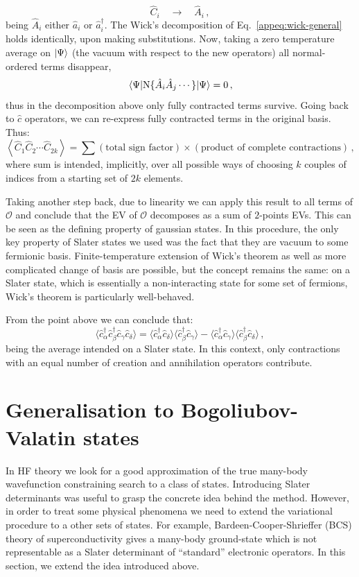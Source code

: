 \[
	\hat C_i \quad\to\quad \hat A_i \, ,
\]
being $\hat A_i$ either $\hat a_i$ or $\hat a_i^\dagger$. The Wick's decomposition of Eq.~\eqref{appeq:wick-general} holds identically, upon making substitutions. Now, taking a zero temperature average on $\ket{\Psi}$ (the vacuum with respect to the new operators) all normal-ordered terms disappear,
\[
	\mel{\Psi}{\mathrm{N}\lbrace \hat A_i \hat A_j \cdots \rbrace}{\Psi} = 0 \, ,
\]
thus in the decomposition above only fully contracted terms survive. Going back to $\hat c$ operators, we can re-express fully contracted terms in the original basis. Thus:
\[
	\left\langle \hat C_1 \hat C_2 \cdots \hat C_{2k} \right\rangle = \sum (\text{total sign factor}) \times (\text{product of complete contractions}) \, ,
\]
where sum is intended, implicitly, over all possible ways of choosing $k$ couples of indices from a starting set of $2k$ elements.

Taking another step back, due to linearity we can apply this result to all terms of $\mathcal{O}$ and conclude that the EV of $\mathcal{O}$ decomposes as a sum of $2$-points EVs. This can be seen as the defining property of gaussian states. In this procedure, the only key property of Slater states we used was the fact that they are vacuum to some fermionic basis. Finite-temperature extension of Wick's theorem as well as more complicated change of basis are possible, but the concept remains the same: on a Slater state, which is essentially a non-interacting state for some set of fermions, Wick's theorem is particularly well-behaved.

From the point above we can conclude that:
\[
	\langle
	\hat c_\alpha^\dagger \hat c_\beta^\dagger \hat c_\gamma \hat c_\delta
	\rangle =
	\langle 
	\hat c_\alpha^\dagger \hat c_\delta
	\rangle \langle	
	\hat c_\beta^\dagger \hat c_\gamma 
	\rangle
	- 
	\langle 
	\hat c_\alpha^\dagger \hat c_\gamma
	\rangle \langle	
	\hat c_\beta^\dagger \hat c_\delta 
	\rangle \, ,
\]
being the average intended on a Slater state. In this context, only contractions with an equal number of creation and annihilation operators contribute.

\section{Generalisation to Bogoliubov-Valatin states}\label{appsec:bogoliubov-valatin}

In HF theory we look for a good approximation of the true many-body wavefunction constraining search to a class of states. Introducing Slater determinants was useful to grasp the concrete idea behind the method. However, in order to treat some physical phenomena we need to extend the variational procedure to a other sets of states. For example, Bardeen-Cooper-Shrieffer (BCS) theory of superconductivity gives a many-body ground-state which is not representable as a Slater determinant of ``standard'' electronic operators. In this section, we extend the idea introduced above.

